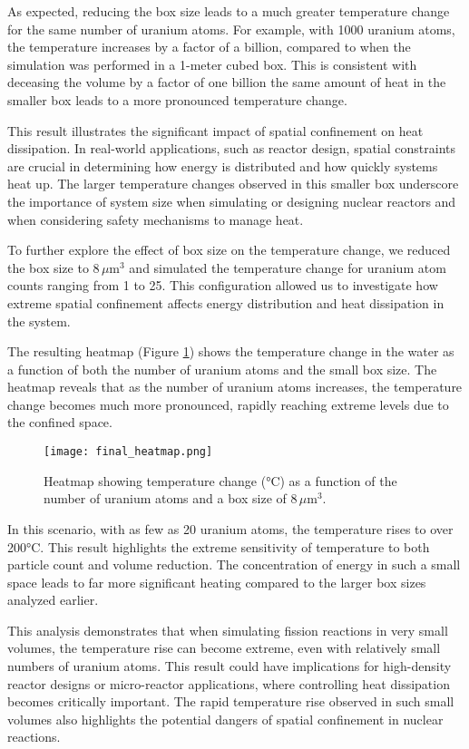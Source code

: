 \documentclass[twocolumn, 11pt]{article}
\begin{document}
As expected, reducing the box size leads to a much greater temperature change for the same number of uranium atoms. For example, with 1000 uranium atoms, the temperature increases by a factor of a billion, compared to when the simulation was performed in a 1-meter cubed box. This is consistent with deceasing the volume by a factor of one billion the same amount of heat in the smaller box leads to a more pronounced temperature change.

This result illustrates the significant impact of spatial confinement on heat dissipation. In real-world applications, such as reactor design, spatial constraints are crucial in determining how energy is distributed and how quickly systems heat up. The larger temperature changes observed in this smaller box underscore the importance of system size when simulating or designing nuclear reactors and when considering safety mechanisms to manage heat.

To further explore the effect of box size on the temperature change, we reduced the box size to \(8 \, \mu\text{m}^3\) and simulated the temperature change for uranium atom counts ranging from 1 to 25. This configuration allowed us to investigate how extreme spatial confinement affects energy distribution and heat dissipation in the system.

The resulting heatmap (Figure \ref{fig:heatmap_analysis}) shows the temperature change in the water as a function of both the number of uranium atoms and the small box size. The heatmap reveals that as the number of uranium atoms increases, the temperature change becomes much more pronounced, rapidly reaching extreme levels due to the confined space.

\begin{figure}[h]
    \centering
    \texttt{[image: final\_heatmap.png]}
    \caption{Heatmap showing temperature change (°C) as a function of the number of uranium atoms and a box size of \(8 \, \mu\text{m}^3\).}
    \label{fig:heatmap_analysis}
\end{figure}

In this scenario, with as few as 20 uranium atoms, the temperature rises to over 200°C. This result highlights the extreme sensitivity of temperature to both particle count and volume reduction. The concentration of energy in such a small space leads to far more significant heating compared to the larger box sizes analyzed earlier.

This analysis demonstrates that when simulating fission reactions in very small volumes, the temperature rise can become extreme, even with relatively small numbers of uranium atoms. This result could have implications for high-density reactor designs or micro-reactor applications, where controlling heat dissipation becomes critically important. The rapid temperature rise observed in such small volumes also highlights the potential dangers of spatial confinement in nuclear reactions.
\end{document}

